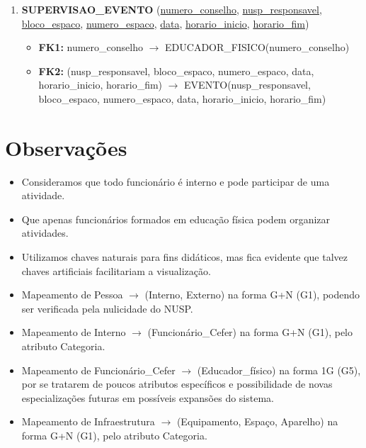 \documentclass{article}
\begin{document}
\begin{enumerate}
    \item \textbf{SUPERVISAO\_EVENTO} (\underline{numero\_conselho}, \underline{nusp\_responsavel}, \underline{bloco\_espaco}, \underline{numero\_espaco}, \underline{data}, \underline{horario\_inicio}, \underline{horario\_fim})
        \begin{itemize}
            \item \textbf{FK1:} numero\_conselho $\rightarrow$ EDUCADOR\_FISICO(numero\_conselho)
            \item \textbf{FK2:} (nusp\_responsavel, bloco\_espaco, numero\_espaco, data, horario\_inicio, horario\_fim) $\rightarrow$ EVENTO(nusp\_responsavel, bloco\_espaco, numero\_espaco, data, horario\_inicio, horario\_fim)
        \end{itemize}
\end{enumerate}

\section*{Observações}
\begin{itemize}
    \item Consideramos que todo funcionário é interno e pode participar de uma atividade.
    \item Que apenas funcionários formados em educação física podem organizar atividades.
    \item Utilizamos chaves naturais para fins didáticos, mas fica evidente que talvez chaves artificiais facilitariam a visualização.
    \item Mapeamento de Pessoa $\rightarrow$ (Interno, Externo) na forma G+N (G1), podendo ser verificada pela nulicidade do NUSP.
    \item Mapeamento de Interno $\rightarrow$ (Funcionário\_Cefer) na forma G+N (G1), pelo atributo Categoria.
    \item Mapeamento de Funcionário\_Cefer $\rightarrow$ (Educador\_físico) na forma 1G (G5), por se tratarem de poucos atributos específicos e possibilidade de novas especializações futuras em possíveis expansões do sistema.
    \item Mapeamento de Infraestrutura $\rightarrow$ (Equipamento, Espaço, Aparelho) na forma G+N (G1), pelo atributo Categoria.
\end{itemize}
\end{document}
